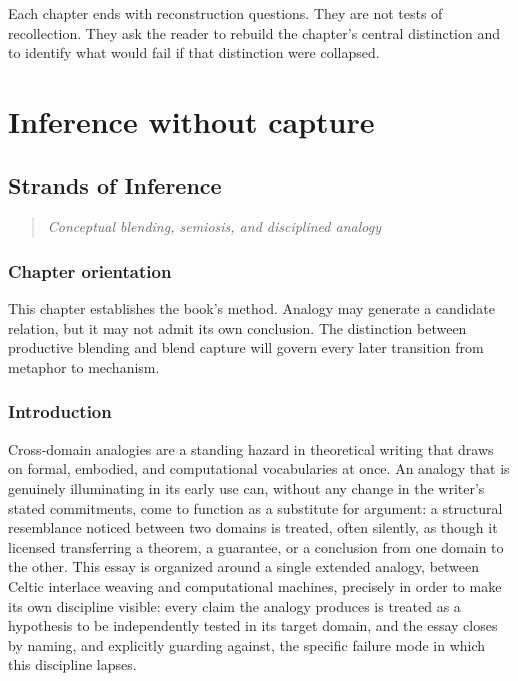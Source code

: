 \documentclass[11pt,openany]{book}
\newcommand{\chapterprecis}[1]{\begin{quote}\itshape #1\end{quote}}
\begin{document}
Each chapter ends with reconstruction questions. They are not tests of recollection. They ask the reader to rebuild the chapter's central distinction and to identify what would fail if that distinction were collapsed.

\tableofcontents
\mainmatter
\part{Inference without capture}


\chapter{Strands of Inference}

\chapterprecis{Conceptual blending, semiosis, and disciplined analogy}

\section*{Chapter orientation}

This chapter establishes the book's method. Analogy may generate a candidate relation, but it may not admit its own conclusion. The distinction between productive blending and blend capture will govern every later transition from metaphor to mechanism.

\section{Introduction}

Cross-domain analogies are a standing hazard in theoretical writing that draws on formal, embodied, and computational vocabularies at once. An analogy that is genuinely illuminating in its early use can, without any change in the writer's stated commitments, come to function as a substitute for argument: a structural resemblance noticed between two domains is treated, often silently, as though it licensed transferring a theorem, a guarantee, or a conclusion from one domain to the other. This essay is organized around a single extended analogy, between Celtic interlace weaving and computational machines, precisely in order to make its own discipline visible: every claim the analogy produces is treated as a hypothesis to be independently tested in its target domain, and the essay closes by naming, and explicitly guarding against, the specific failure mode in which this discipline lapses.
\end{document}
